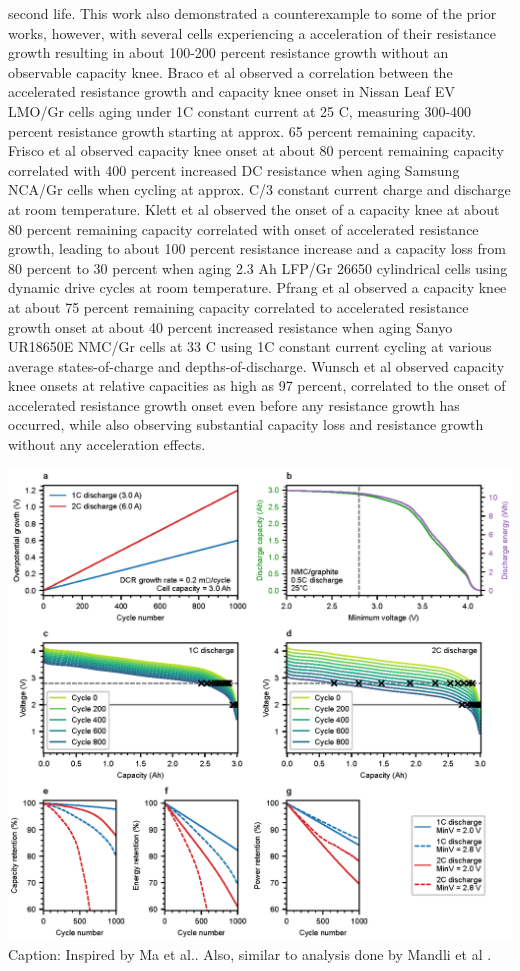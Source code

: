 \documentclass{article}
\newcommand{\pbox}[1]{{
\fbox{
\parbox{0.8\textwidth}{  \fbox{$\triangleright$\textcolor{blue}{\textbf{From Peter}:}} 
#1
}}}}
\begin{document}
second life. This work also demonstrated a counterexample to some of the prior works, however, with several cells experiencing a acceleration of their resistance growth resulting in about 100-200 percent resistance growth without an observable capacity knee. Braco et al \cite{braco_experimental_2020} observed a correlation between the accelerated resistance growth and capacity knee onset in Nissan Leaf EV LMO/Gr cells aging under 1C constant current at 25 C, measuring 300-400 percent resistance growth starting at approx. 65 percent remaining capacity. Frisco et al \cite{frisco_understanding_2016} observed capacity knee onset at about 80 percent remaining capacity correlated with 400 percent increased DC resistance when aging Samsung NCA/Gr cells when cycling at approx. C/3 constant current charge and discharge at room temperature.  Klett et al \cite{klett_non-uniform_2014} observed the onset of a capacity knee at about 80 percent remaining capacity correlated with onset of accelerated resistance growth, leading to about 100 percent resistance increase and a capacity loss from 80 percent to 30 percent when aging 2.3 Ah LFP/Gr 26650 cylindrical cells using dynamic drive cycles at room temperature. Pfrang et al \cite{pfrang_long-term_2018} observed a capacity knee at about 75 percent remaining capacity correlated to accelerated resistance growth onset at about 40 percent increased resistance when aging Sanyo UR18650E NMC/Gr cells at 33 C using 1C constant current cycling at various average states-of-charge and depths-of-discharge. Wunsch et al \cite{wunsch_investigation_2019} observed capacity knee onsets at relative capacities as high as 97 percent, correlated to the onset of accelerated resistance growth onset even before any resistance growth has occurred, while also observing substantial capacity loss and resistance growth without any acceleration effects.

\pbox{
PNG is there, create EPS too
}
{
\centering
\includegraphics[scale=0.9]{figures/dcr_growth_knee_2.eps}
}
Caption: Inspired by Ma et al.\cite{ma_editors_2019}. Also, similar to analysis done by Mandli et al \cite{mandli_analysis_2019}.
\end{document}
